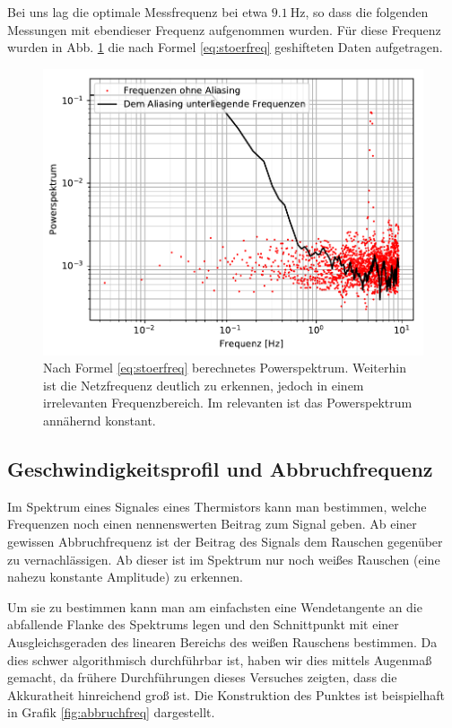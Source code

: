 \documentclass[12pt,a4paper,titlepage,headinclude]{scrartcl}
\numberwithin{equation}{subsection}
\begin{document}
Bei uns lag die optimale Messfrequenz bei etwa $\SI{9.1}\hertz$, so dass die folgenden Messungen mit ebendieser Frequenz aufgenommen wurden.
Für diese Frequenz wurden in Abb. \ref{fig:stoershift} die nach Formel \ref{eq:stoerfreq} geshifteten Daten aufgetragen.

\begin{figure}[h]
	\centering
	\includegraphics[width=0.6\linewidth]{stoer_shift}
	\caption{Nach Formel \ref{eq:stoerfreq} berechnetes Powerspektrum. Weiterhin ist die Netzfrequenz deutlich zu erkennen, jedoch in einem irrelevanten Frequenzbereich. Im relevanten ist das Powerspektrum annähernd konstant.}
	\label{fig:stoershift}
\end{figure}

\subsection{Geschwindigkeitsprofil und Abbruchfrequenz}
\label{sec:abbruch}
Im Spektrum eines Signales eines Thermistors kann man bestimmen, welche Frequenzen noch einen nennenswerten Beitrag zum Signal geben.
Ab einer gewissen Abbruchfrequenz ist der Beitrag des Signals dem Rauschen gegenüber zu vernachlässigen.
Ab dieser ist im Spektrum nur noch weißes Rauschen (eine nahezu konstante Amplitude) zu erkennen.

Um sie zu bestimmen kann man am einfachsten eine Wendetangente an die abfallende Flanke des Spektrums legen und den Schnittpunkt mit einer Ausgleichsgeraden des linearen Bereichs des weißen Rauschens bestimmen.
Da dies schwer algorithmisch durchführbar ist, haben wir dies mittels Augenmaß gemacht, da frühere Durchführungen dieses Versuches zeigten, dass die Akkuratheit hinreichend groß ist.
Die Konstruktion des Punktes ist beispielhaft in Grafik \ref{fig:abbruchfreq} dargestellt.
\end{document}
